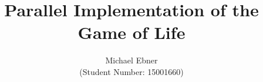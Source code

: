 \documentclass[%
	11pt,%
	a4paper,%
	twoside,
	]{scrreprt}
\renewcommand{\sectionmark}[1]{\markboth{\thesection.\ #1}{}}
\renewcommand{\subsectionmark}[1]{\markright{\thesubsection.\ #1}{}}
\begin{document}
\pagestyle{fancy}
\lhead{\leftmark}
\chead{}
\rhead{\rightmark}
\lfoot{}
\cfoot{\thepage}
\rfoot{}

\title{Parallel Implementation of the Game of Life}
\subject{MPHYG002: Research Computing with C++}
\author{Michael Ebner\\(Student Number: 15001660)}



\maketitle           
\thispagestyle{empty} 
\cleardoublepage

\pagestyle{plain}     %
\tableofcontents      
\cleardoublepage

\pagestyle{fancy}
\setcounter{page}{1}




\cleardoublepage

%

\cleardoublepage

%
\end{document}
